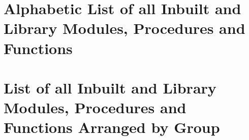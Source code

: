 \documentclass[10pt,a4paper,twoside,fleqn]{book}
\begin{document}






\chapter{Alphabetic List of all Inbuilt and Library Modules, Procedures and
Functions}

    




\chapter{List of all Inbuilt and Library Modules, Procedures and
Functions Arranged by Group}

    






\pagebreak

{}
\printindex
    
\end{document}
